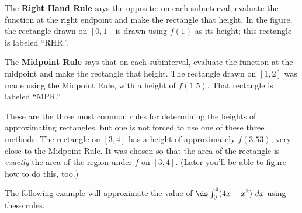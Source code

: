 
The \textbf{Right Hand Rule} says the opposite: on each subinterval, evaluate the function at the right endpoint and make the rectangle that height. In the figure, the rectangle drawn on $[0,1]$ is drawn using $f(1)$ as its height; this rectangle is labeled ``RHR.''.

The \textbf{Midpoint Rule} says that on each subinterval, evaluate the function at the midpoint and make the rectangle that height. The rectangle drawn on $[1,2]$ was made using the Midpoint Rule, with a height of $f(1.5)$. That rectangle is labeled ``MPR.''

These are the three most common rules for determining the heights of approximating rectangles, but one is not forced to use one of these three methods. The rectangle on $[3,4]$ has a height of approximately $f(3.53)$, very close to the Midpoint Rule. It was chosen so that the area of the rectangle is \textit{exactly} the area of the region under $f$ on $[3,4]$. (Later you'll be able to figure how to do this, too.)

The following example will approximate the value of $\ds\int_0^4 (4x-x^2)\ dx$ using these rules.

